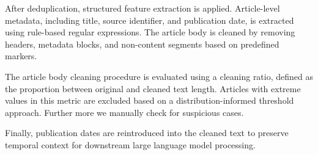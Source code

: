 After deduplication, structured feature extraction is applied. Article-level metadata, including title, source identifier, and publication date, is extracted using rule-based regular expressions. The article body is cleaned by removing headers, metadata blocks, and non-content segments based on predefined markers.

The article body cleaning procedure is evaluated using a cleaning ratio, defined as the proportion between original and cleaned text length. Articles with extreme values in this metric are excluded based on a distribution-informed threshold approach. Further more we manually check for suspicious cases.

Finally, publication dates are reintroduced into the cleaned text to preserve temporal context for downstream large language model processing. 